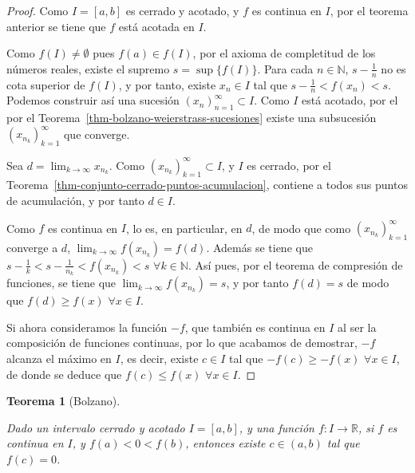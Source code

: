 \documentclass[
  a4paper,
]{scrreport}
\theoremstyle{definition}
\theoremstyle{plain}
\theoremstyle{definition}
\theoremstyle{definition}
\theoremstyle{plain}
\newtheorem{theorem}{Teorema}[chapter]
\theoremstyle{plain}
\theoremstyle{remark}
\begin{document}
\begin{tcolorbox}[enhanced jigsaw, leftrule=.75mm, colbacktitle=quarto-callout-note-color!10!white, toprule=.15mm, opacityback=0, opacitybacktitle=0.6, toptitle=1mm, breakable, bottomtitle=1mm, colframe=quarto-callout-note-color-frame, rightrule=.15mm, titlerule=0mm, title=\textcolor{quarto-callout-note-color}{\faInfo}\hspace{0.5em}{Demostración}, arc=.35mm, left=2mm, bottomrule=.15mm, colback=white, coltitle=black]

\begin{proof}
Como \(I=[a,b]\) es cerrado y acotado, y \(f\) es continua en \(I\), por
el teorema anterior se tiene que \(f\) está acotada en \(I\).

Como \(f(I)\neq \emptyset\) pues \(f(a)\in f(I)\), por el axioma de
completitud de los números reales, existe el supremo \(s=\sup\{f(I)\}\).
Para cada \(n\in\mathbb{N}\), \(s-\frac{1}{n}\) no es cota superior de
\(f(I)\), y por tanto, existe \(x_n\in I\) tal que
\(s-\frac{1}{n}<f(x_n)<s\). Podemos construir así una sucesión
\((x_n)_{n=1}^\infty\subset I\). Como \(I\) está acotado, por el por el
Teorema~\ref{thm-bolzano-weierstrass-sucesiones} existe una subsucesión
\((x_{n_k})_{k=1}^\infty\) que converge.

Sea \(d=\lim_{k\to\infty}x_{n_k}\). Como
\((x_{n_k})_{k=1}^\infty\subset I\), y \(I\) es cerrado, por el
Teorema~\ref{thm-conjunto-cerrado-puntos-acumulacion}, contiene a todos
sus puntos de acumulación, y por tanto \(d\in I\).

Como \(f\) es continua en \(I\), lo es, en particular, en \(d\), de modo
que como \((x_{n_k})_{k=1}^\infty\) converge a \(d\),
\(\lim_{k\to\infty}f(x_{n_k}) = f(d)\). Además se tiene que
\(s-\frac{1}{k}<s-\frac{1}{n_k}<f(x_{n_k})<s\)
\(\forall k\in\mathbb{N}\). Así pues, por el teorema de compresión de
funciones, se tiene que \(\lim_{k\to\infty} f(x_{n_k})=s\), y por tanto
\(f(d)=s\) de modo que \(f(d)\geq f(x)\) \(\forall x\in I\).

Si ahora consideramos la función \(-f\), que también es continua en
\(I\) al ser la composición de funciones continuas, por lo que acabamos
de demostrar, \(-f\) alcanza el máximo en \(I\), es decir, existe
\(c\in I\) tal que \(-f(c)\geq -f(x)\) \(\forall x\in I\), de donde se
deduce que \(f(c)\leq f(x)\) \(\forall x\in I\).
\end{proof}

\end{tcolorbox}

\begin{theorem}[Bolzano]\protect\hypertarget{thm-bolzano}{}\label{thm-bolzano}

Dado un intervalo cerrado y acotado \(I=[a,b]\), y una función
\(f:I\to\mathbb{R}\), si \(f\) es continua en \(I\), y \(f(a)<0<f(b)\),
entonces existe \(c\in(a,b)\) tal que \(f(c)=0\).

\end{theorem}
\end{document}
